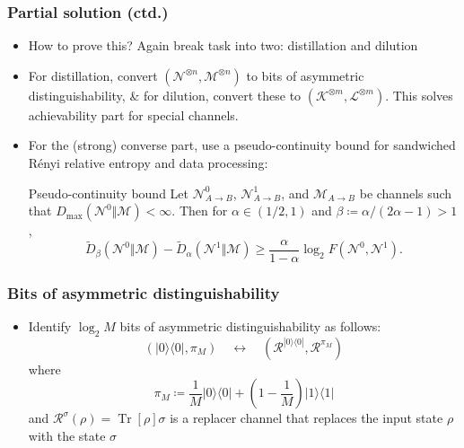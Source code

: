 \documentclass[usenames,dvipsnames,handout]{beamer}
\begin{document}
\begin{frame}
\frametitle{Partial solution (ctd.)}
\begin{itemize}

\pause
\item How to prove this? Again break task into two: distillation and dilution

\pause
\vspace{.1in}
\item For distillation, convert $(\mathcal{N}^{\otimes n},\mathcal{M}^{\otimes n})$ to bits of asymmetric distinguishability, \& for dilution, convert these to $(\mathcal{K}^{\otimes m},\mathcal{L}^{\otimes m})$. This solves achievability part for special channels.

\pause
\vspace{.1in}
\item For the (strong) converse part, use a pseudo-continuity bound for sandwiched R\'enyi relative entropy and data processing:
\pause
\begin{block}{Pseudo-continuity bound}
Let $\mathcal{N}_{A\rightarrow
B}^{0}$, $\mathcal{N}_{A\rightarrow B}^{1}$, and $\mathcal{M}_{A\rightarrow
B}$ be channels such that $D_{\max}(\mathcal{N}^{0}\Vert\mathcal{M})<\infty$.
Then for $\alpha\in(1/2,1)$ and $\beta\coloneqq \alpha/\left(
2\alpha-1\right)  >1$, 
\begin{equation*}
\widetilde{D}_{\beta}(\mathcal{N}^{0}\Vert\mathcal{M})-\widetilde{D}_{\alpha
}(\mathcal{N}^{1}\Vert\mathcal{M})\geq\frac{\alpha}{1-\alpha}\log
_{2}F(\mathcal{N}^{0},\mathcal{N}^{1}).
\end{equation*}
\end{block}

\end{itemize}

\end{frame}


\begin{frame}
\frametitle{Bits of asymmetric distinguishability}

\begin{itemize}

\pause
\item Identify $\log_2 M $ bits of asymmetric distinguishability as follows:
$$
(|0\rangle\!\langle 0 |, \pi_M) \quad \leftrightarrow \quad (\mathcal{R}^{|0\rangle\!\langle 0 |}, \mathcal{R}^{\pi_M})
$$
where $$\pi_{M} \coloneqq  \frac{1}{M}|0\rangle\!\langle 0 | + \left(1-\frac{1}{M}\right)  |1\rangle\!\langle 1 |$$ and $\mathcal{R}^{\sigma}(\rho) = \operatorname{Tr}[\rho]\sigma$ is a replacer channel that replaces the input state $\rho$ with the state $\sigma$


\end{itemize}

\end{frame}
\end{document}
